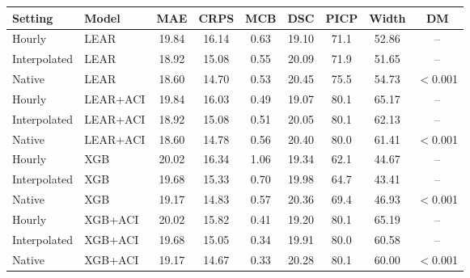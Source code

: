 \begin{tabular}{|l|l|c|c|c|c|c|c|c|}
\hline
Setting & Model & MAE & CRPS & MCB & DSC & PICP & Width & DM \\
\hline
Hourly & LEAR & 19.84 & 16.14 & 0.63 & 19.10 & 71.1 & 52.86 & -- \\
Interpolated & LEAR & 18.92 & 15.08 & 0.55 & 20.09 & 71.9 & 51.65 & -- \\
Native & LEAR & 18.60 & 14.70 & 0.53 & 20.45 & 75.5 & 54.73 & \ensuremath{<}0.001 \\
\hline
Hourly & LEAR+ACI & 19.84 & 16.03 & 0.49 & 19.07 & 80.1 & 65.17 & -- \\
Interpolated & LEAR+ACI & 18.92 & 15.08 & 0.51 & 20.05 & 80.1 & 62.13 & -- \\
Native & LEAR+ACI & 18.60 & 14.78 & 0.56 & 20.40 & 80.0 & 61.41 & \ensuremath{<}0.001 \\
\hline
Hourly & XGB & 20.02 & 16.34 & 1.06 & 19.34 & 62.1 & 44.67 & -- \\
Interpolated & XGB & 19.68 & 15.33 & 0.70 & 19.98 & 64.7 & 43.41 & -- \\
Native & XGB & 19.17 & 14.83 & 0.57 & 20.36 & 69.4 & 46.93 & \ensuremath{<}0.001 \\
\hline
Hourly & XGB+ACI & 20.02 & 15.82 & 0.41 & 19.20 & 80.1 & 65.19 & -- \\
Interpolated & XGB+ACI & 19.68 & 15.05 & 0.34 & 19.91 & 80.0 & 60.58 & -- \\
Native & XGB+ACI & 19.17 & 14.67 & 0.33 & 20.28 & 80.1 & 60.00 & \ensuremath{<}0.001 \\
\hline
\end{tabular}
